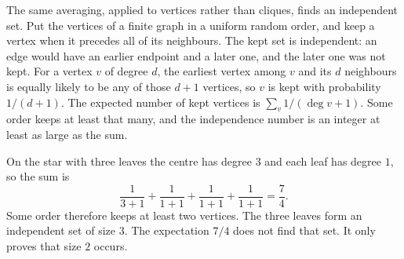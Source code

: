 The same averaging, applied to vertices rather than cliques, finds an independent set. Put the vertices of a finite graph in a uniform random order, and keep a vertex when it precedes all of its neighbours. The kept set is independent: an edge would have an earlier endpoint and a later one, and the later one was not kept. For a vertex $v$ of degree $d$, the earliest vertex among $v$ and its $d$ neighbours is equally likely to be any of those $d+1$ vertices, so $v$ is kept with probability $1/(d+1)$. The expected number of kept vertices is $\sum_v 1/(\deg v+1)$. Some order keeps at least that many, and the independence number is an integer at least as large as the sum.

On the star with three leaves the centre has degree $3$ and each leaf has degree $1$, so the sum is
\[
 \frac1{3+1}+\frac1{1+1}+\frac1{1+1}+\frac1{1+1}=\frac74.
\]
Some order therefore keeps at least two vertices. The three leaves form an independent set of size $3$. The expectation $7/4$ does not find that set. It only proves that size $2$ occurs.

